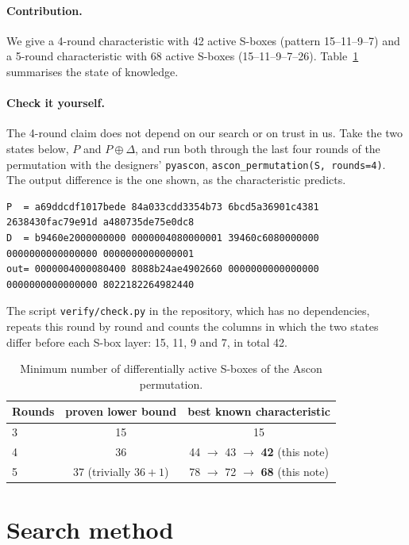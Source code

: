 \documentclass[11pt,a4paper]{article}
\begin{document}
\paragraph{Contribution.} We give a 4-round characteristic with 42 active S-boxes (pattern
15--11--9--7) and a 5-round characteristic with 68 active S-boxes (15--11--9--7--26).
Table~\ref{tab:summary} summarises the state of knowledge.

\paragraph{Check it yourself.} The 4-round claim does not depend on our search or on trust in us. Take
the two states below, $P$ and $P\oplus\Delta$, and run both through the last four rounds of the permutation with the
designers' \texttt{pyascon}, \texttt{ascon\_permutation(S, rounds=4)}. The output difference is the one
shown, as the characteristic predicts.
{\footnotesize
\begin{verbatim}
P  = a69ddcdf1017bede 84a033cdd3354b73 6bcd5a36901c4381 2638430fac79e91d a480735de75e0dc8
D  = b9460e2000000000 0000004080000001 39460c6080000000 0000000000000000 0000000000000001
out= 0000004000080400 8088b24ae4902660 0000000000000000 0000000000000000 8022182264982440
\end{verbatim}
}
\noindent The script \texttt{verify/check.py} in the repository, which has no dependencies, repeats this round by round and counts the columns
in which the two states differ before each S-box layer: 15, 11, 9 and 7, in total 42.

\begin{table}[h]
\centering
\caption{Minimum number of differentially active S-boxes of the Ascon permutation.}
\label{tab:summary}
\begin{tabular}{lcc}
\toprule
Rounds & proven lower bound & best known characteristic \\
\midrule
3 & 15 \cite{DEMS21} & 15 \\
4 & 36 \cite{EME22} & 44 \cite{DEMS21} $\to$ 43 \cite{MR22} $\to$ \textbf{42} (this note) \\
5 & 37 (trivially $36+1$) & 78 \cite{DEMS21} $\to$ 72 \cite{MR22} $\to$ \textbf{68} (this note) \\
\bottomrule
\end{tabular}
\end{table}

\section{Search method}
\end{document}
